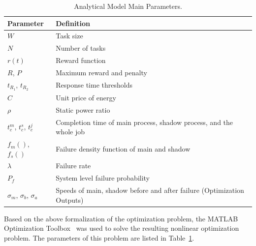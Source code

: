\begin{table}[!h]
\caption{Analytical Model Main Parameters.}
\centering
\begin{tabularx}{\columnwidth}{|l|X|}
\hline
Parameter                          & Definition                         \\
\hline
$W$                               & Task size                       \\
\hline
$N$                               & Number of tasks                 \\
\hline
$r(t)$                          & Reward function       \\
\hline
$R$, $P$                            & Maximum reward and penalty      \\
\hline
$t_{R_1}$, $t_{R_2}$             & Response time thresholds  \\
\hline
$C$                               & Unit price of energy            \\
\hline
$\rho$                          & Static power ratio                 \\
\hline
$t_c^m$, $t_c^s$, $t_c^{j}$                 & Completion time of main process, shadow process, and the whole job \\
\hline
$f_m()$, $f_s()$                    & Failure density function of main and shadow  \\
\hline
$\lambda$                           & Failure rate    \\
\hline
$P_f$                               & System level failure probability \\
\hline
$\sigma_m$, $\sigma_b$, $ \sigma_a$  & Speeds of main, shadow before and after failure (Optimization Outputs) \\
\hline
\end{tabularx}

\label{tbl:symbols}
\end{table}

Based on the above formalization of the optimization problem, the
MATLAB Optimization Toolbox~\cite{matlab_opt} was used to solve the
resulting nonlinear optimization problem. The parameters of this
problem are listed in Table~\ref{tbl:symbols}. 



